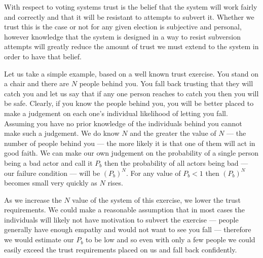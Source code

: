 With respect to voting systems trust is the belief that the system will work fairly and correctly and that it will be resistant to attempts to subvert it. Whether we trust this is the case or not for any given election is subjective and personal, however knowledge that the system is designed in a way to resist subversion attempts will greatly reduce the amount of trust we must extend to the system in order to have that belief.

Let us take a simple example, based on a well known trust exercise. You stand on a chair and there are $N$ people behind you. You fall back trusting that they will catch you and let us say that if any one person reaches to catch you then you will be safe. Clearly, if you know the people behind you, you will be better placed to make a judgement on each one's individual likelihood of letting you fall. Assuming you have no prior knowledge of the individuals behind you cannot make such a judgement. We do know $N$ and the greater the value of $N$ --- the number of people behind you --- the more likely it is that one of them will act in good faith. We can make our own judgement on the probability of a single person being a bad actor and call it $P_b$ then the probability of all actors being bad --- our failure condition --- will be $(P_b)^N$. For any value of $P_b < 1$ then $(P_b)^N$ becomes small very quickly as $N$ rises.

As we increase the $N$ value of the system of this exercise, we lower the trust requirements. We could make a reasonable assumption that in most cases the individuals will likely not have motivation to subvert the exercise --- people generally have enough empathy and would not want to see you fall --- therefore we would estimate our $P_b$ to be low and so even with only a few people we could easily exceed the trust requirements placed on us and fall back confidently.


